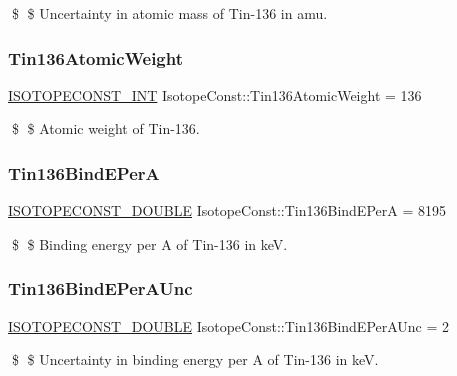 \$ \$ Uncertainty in atomic mass of Tin-\/136 in amu. \mbox{\label{group___isotope_const-_tin-_sn136_ga5992d548df5ea0e796a270260b3acaac}} 
\subsubsection{\texorpdfstring{Tin136\+Atomic\+Weight}{Tin136AtomicWeight}}
{\footnotesize\ttfamily \mbox{\hyperlink{group___isotope_const-_macros_ga5f18360b3e99483a35c32d789e62621c}{I\+S\+O\+T\+O\+P\+E\+C\+O\+N\+S\+T\+\_\+\+I\+NT}} Isotope\+Const\+::\+Tin136\+Atomic\+Weight = 136}

\$ \$ Atomic weight of Tin-\/136. \mbox{\label{group___isotope_const-_tin-_sn136_ga0e871cbb019d5570de5da0f4fbb5dc50}} 
\subsubsection{\texorpdfstring{Tin136\+Bind\+E\+PerA}{Tin136BindEPerA}}
{\footnotesize\ttfamily \mbox{\hyperlink{group___isotope_const-_macros_ga8f45a7272ce02c0b4c65c44636ed719a}{I\+S\+O\+T\+O\+P\+E\+C\+O\+N\+S\+T\+\_\+\+D\+O\+U\+B\+LE}} Isotope\+Const\+::\+Tin136\+Bind\+E\+PerA = 8195}

\$ \$ Binding energy per A of Tin-\/136 in keV. \mbox{\label{group___isotope_const-_tin-_sn136_gac07247d76fe2ebca9b6666582ecc408b}} 
\subsubsection{\texorpdfstring{Tin136\+Bind\+E\+Per\+A\+Unc}{Tin136BindEPerAUnc}}
{\footnotesize\ttfamily \mbox{\hyperlink{group___isotope_const-_macros_ga8f45a7272ce02c0b4c65c44636ed719a}{I\+S\+O\+T\+O\+P\+E\+C\+O\+N\+S\+T\+\_\+\+D\+O\+U\+B\+LE}} Isotope\+Const\+::\+Tin136\+Bind\+E\+Per\+A\+Unc = 2}

\$ \$ Uncertainty in binding energy per A of Tin-\/136 in keV. \mbox{\label{group___isotope_const-_tin-_sn136_ga808798fbedad26c28c7549521e379cb9}} 
